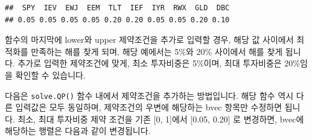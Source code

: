 \documentclass[12pt,]{book}
\newenvironment{Shaded}{\begin{snugshade}}{\end{snugshade}}
\newcommand{\DataTypeTok}[1]{\textcolor[rgb]{0.13,0.29,0.53}{#1}}
\newcommand{\DecValTok}[1]{\textcolor[rgb]{0.00,0.00,0.81}{#1}}
\newcommand{\FloatTok}[1]{\textcolor[rgb]{0.00,0.00,0.81}{#1}}
\newcommand{\KeywordTok}[1]{\textcolor[rgb]{0.13,0.29,0.53}{\textbf{#1}}}
\newcommand{\NormalTok}[1]{#1}
\newcommand{\OperatorTok}[1]{\textcolor[rgb]{0.81,0.36,0.00}{\textbf{#1}}}
\newcommand{\StringTok}[1]{\textcolor[rgb]{0.31,0.60,0.02}{#1}}
\begin{document}
\begin{Shaded}
\end{Shaded}

\begin{verbatim}
##  SPY  IEV  EWJ  EEM  TLT  IEF  IYR  RWX  GLD  DBC 
## 0.05 0.05 0.05 0.05 0.20 0.20 0.05 0.05 0.20 0.10
\end{verbatim}

함수의 마지막에 lower와 upper 제약조건을 추가로 입력할 경우, 해당 값 사이에서 최적화를 만족하는 해를 찾게 되며, 해당 예에서는 5\%와 20\% 사이에서 해를 찾게 됩니다. 추가로 입력한 제약조건에 맞게, 최소 투자비중은 5\%이며, 최대 투자비중은 20\%임을 확인할 수 있습니다.

다음은 \texttt{solve.QP()} 함수 내에서 제약조건을 추가하는 방법입니다. 해당 함수 역시 다른 입력값은 모두 동일하며, 제약조건의 우변에 해당하는 bvec 항목만 수정하면 됩니다. 최소, 최대 투자비중 제약 조건을 기존 {[}0, 1{]}에서 {[}0.05, 0.20{]} 로 변경하면, bvec에 해당하는 행렬은 다음과 같이 변경됩니다.
\end{document}
